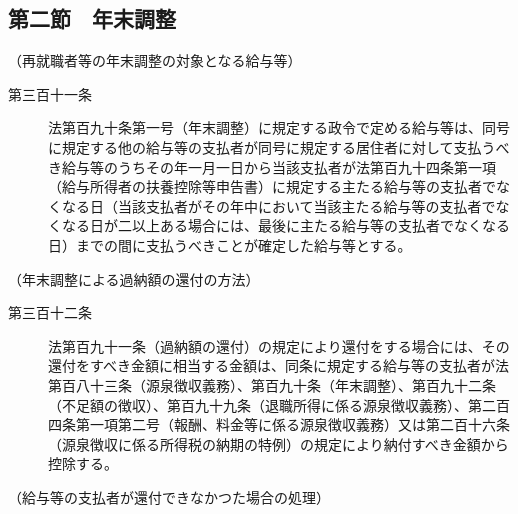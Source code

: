 \documentclass[twocolumn,a4j,10pt]{ltjtarticle}
\begin{document}
\subsection*{第二節　年末調整}
\noindent\hspace{10pt}（再就職者等の年末調整の対象となる給与等）
\begin{description}
\item[第三百十一条]法第百九十条第一号（年末調整）に規定する政令で定める給与等は、同号に規定する他の給与等の支払者が同号に規定する居住者に対して支払うべき給与等のうちその年一月一日から当該支払者が法第百九十四条第一項（給与所得者の扶養控除等申告書）に規定する主たる給与等の支払者でなくなる日（当該支払者がその年中において当該主たる給与等の支払者でなくなる日が二以上ある場合には、最後に主たる給与等の支払者でなくなる日）までの間に支払うべきことが確定した給与等とする。
\end{description}
\noindent\hspace{10pt}（年末調整による過納額の還付の方法）
\begin{description}
\item[第三百十二条]法第百九十一条（過納額の還付）の規定により還付をする場合には、その還付をすべき金額に相当する金額は、同条に規定する給与等の支払者が法第百八十三条（源泉徴収義務）、第百九十条（年末調整）、第百九十二条（不足額の徴収）、第百九十九条（退職所得に係る源泉徴収義務）、第二百四条第一項第二号（報酬、料金等に係る源泉徴収義務）又は第二百十六条（源泉徴収に係る所得税の納期の特例）の規定により納付すべき金額から控除する。
\end{description}
\noindent\hspace{10pt}（給与等の支払者が還付できなかつた場合の処理）
\end{document}

